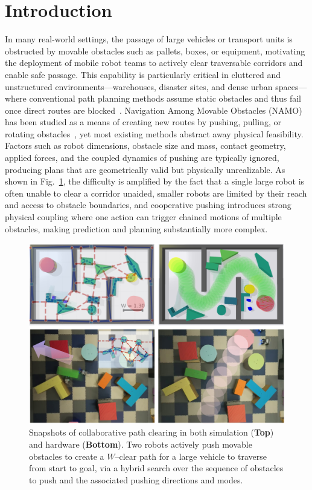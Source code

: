 \section{Introduction}\label{sec:intro}
In many real-world settings, the passage of large vehicles or transport units is
obstructed by movable obstacles such as pallets, boxes, or equipment, motivating
the deployment of mobile robot teams to actively clear traversable corridors and
enable safe passage. This capability is particularly critical in cluttered and
unstructured environments—warehouses, disaster sites, and dense urban spaces—
where conventional path planning methods assume static obstacles and thus fail
once direct routes are blocked~\cite{liu2023path}. Navigation Among Movable
Obstacles (NAMO) has been studied as a means of creating new routes by pushing,
pulling, or rotating obstacles~\cite{stilman2005navigation}, yet most existing
methods abstract away physical feasibility. Factors such as robot dimensions,
obstacle size and mass, contact geometry, applied forces, and the coupled
dynamics of pushing are typically ignored, producing plans that are geometrically
valid but physically unrealizable. As shown in Fig.~\ref{fig:snapshots},
the difficulty is amplified by the fact that
a single large robot is often unable to clear a corridor unaided, smaller robots
are limited by their reach and access to obstacle boundaries, and cooperative
pushing introduces strong physical coupling where one action can trigger chained
motions of multiple obstacles, making prediction and planning substantially more
complex.

\begin{figure}[t!]
  \centering
  \includegraphics[width=0.95\linewidth]{figures/cover.png}%
  \vspace{-0.1in}
  \caption{
    Snapshots of collaborative path clearing in both simulation (\textbf{Top})
    and hardware (\textbf{Bottom}). Two robots actively push movable
    obstacles to create a $W$--clear path for a large vehicle
    to traverse from start to goal,
    via a hybrid search over the sequence of obstacles 
    to push and the associated pushing directions and modes.
  }
  \vspace{-6mm}
  \label{fig:snapshots}
\end{figure}


